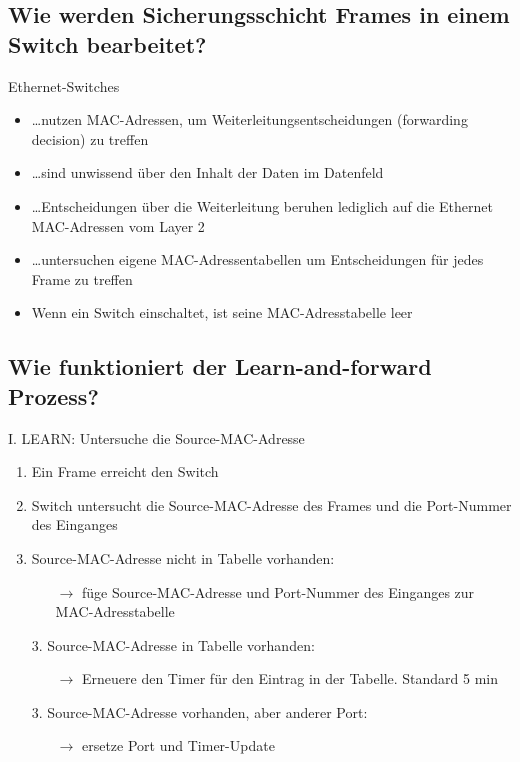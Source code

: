 \subsection*{Wie werden Sicherungsschicht Frames in einem Switch bearbeitet? }
Ethernet-Switches
\begin{itemize}
    \item \dots{}nutzen MAC-Adressen, um Weiterleitungsentscheidungen (forwarding decision) zu treffen
    \item \dots{}sind unwissend über den Inhalt der Daten im Datenfeld
    \item \dots{}Entscheidungen über die Weiterleitung beruhen lediglich auf die Ethernet MAC-Adressen vom Layer 2
    \item \dots{}untersuchen eigene MAC-Adressentabellen um Entscheidungen für jedes Frame zu treffen
    \item Wenn ein Switch einschaltet, ist seine MAC-Adresstabelle leer
\end{itemize}

\pagebreak
\subsection*{Wie funktioniert der \flqq Learn-and-forward\frqq{} Prozess?}
I. LEARN: Untersuche die Source-MAC-Adresse
\begin{enumerate}
    \item Ein Frame erreicht den Switch
    \item Switch untersucht die Source-MAC-Adresse des Frames und die Port-Nummer des Einganges
    \item Source-MAC-Adresse nicht in Tabelle vorhanden:
    \begin{itemize}
        \item[$\rightarrow$] füge Source-MAC-Adresse und Port-Nummer des Einganges zur MAC-Adresstabelle
    \end{itemize}
    \item[3.] Source-MAC-Adresse in Tabelle vorhanden:
    \begin{itemize}
        \item[$\rightarrow$] Erneuere den Timer für den Eintrag in der Tabelle. Standard 5 min
    \end{itemize}
    \item[3.] Source-MAC-Adresse vorhanden, aber anderer Port:
    \begin{itemize}
        \item[$\rightarrow$] ersetze Port und Timer-Update
    \end{itemize}
\end{enumerate}\,\\

